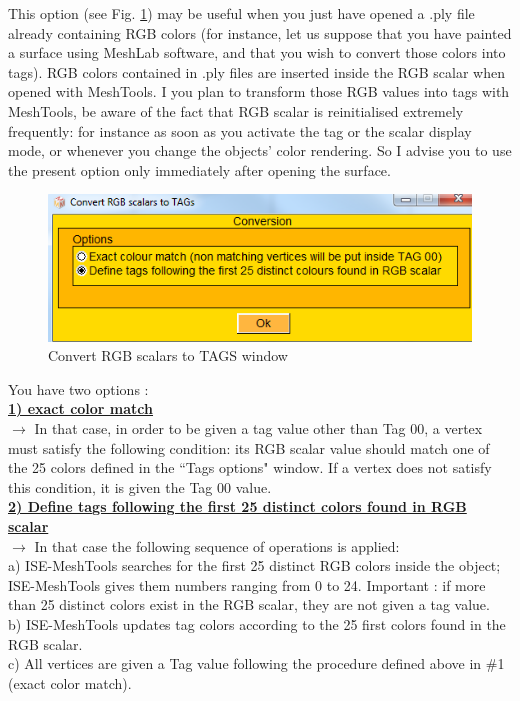 This option (see Fig. \ref{rgb_conversion}) may be useful when you just have opened a .ply file already containing RGB colors (for instance, let us suppose that you have painted a surface using MeshLab software, and that you wish to convert those colors into tags). RGB colors contained in .ply files are inserted inside the RGB scalar when opened with MeshTools. I you plan to transform those RGB values into tags with MeshTools, be aware of the fact that RGB scalar is reinitialised extremely frequently: for instance as soon as you activate the tag or the scalar display mode, or whenever you change the objects' color rendering. So I advise you to use the present option only immediately after opening the surface.
\begin{figure}
  \centering
  \includegraphics[scale=0.5]{images/Tags/Convert.png} 
	\caption{Convert RGB scalars to TAGS window}
\label{rgb_conversion}
\end{figure}
You have two options :\\
\textbf{\underline{1) exact color match}}\\
$\rightarrow$ In that case, in order to be given a tag value other than Tag 00, a vertex must satisfy the following condition: its RGB scalar value should match one of the 25 colors defined in the ``Tags options" window. If a vertex does not satisfy this condition, it is given the Tag 00 value.\\
\textbf{\underline{2) Define tags following the first 25 distinct colors found in RGB scalar}}\\
$\rightarrow$ In that case the following sequence of operations is applied:\\
a) ISE-MeshTools searches for the first 25 distinct RGB colors inside the object; ISE-MeshTools gives them numbers ranging from 0 to 24. Important : if more than 25 distinct colors exist in the RGB scalar, they are not given a tag value.\\
b) ISE-MeshTools updates tag colors according to the 25 first colors found in the RGB scalar.\\
c) All vertices are given a Tag value following the procedure defined above in \#1 (exact color match).\\

